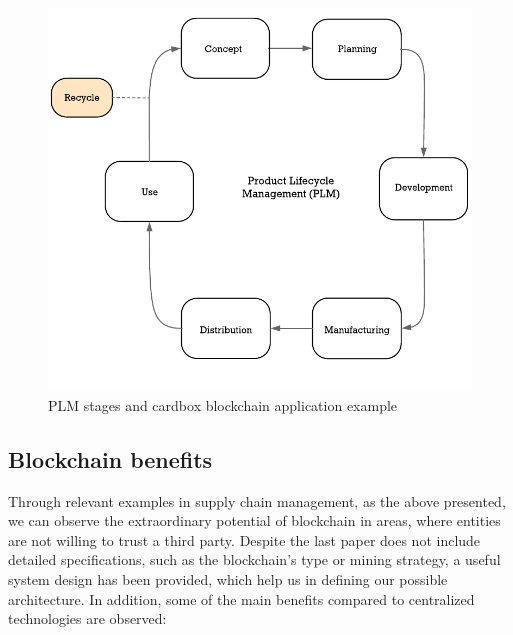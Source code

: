 \begin{figure}
	\includegraphics[width=1\linewidth]{gfx/supplyChain}    
  \caption{ PLM stages and cardbox blockchain application example \citep{stark2015product}}
  \label{fig:supplyChain}
\end{figure}

\subsection{Blockchain benefits}

Through relevant examples in supply chain management, as the above presented, we can observe the extraordinary potential of blockchain in areas, where entities are not willing to trust a third party. Despite the last paper does not include detailed specifications, such as the blockchain's type or mining strategy, a useful system design has been provided, which help us in defining our possible architecture. In addition, some of the main benefits compared to centralized technologies are observed:

